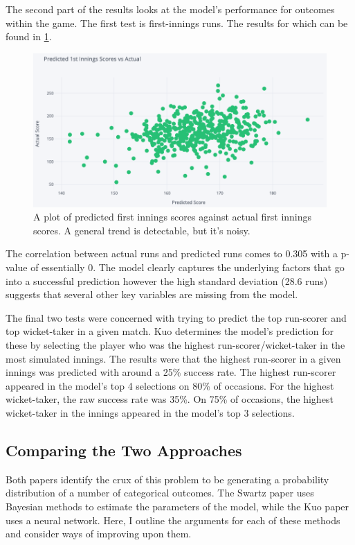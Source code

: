 The second part of the results looks at the model’s performance for outcomes within the game. The first test is first-innings runs. The results for which can be found in \cref{fig:kuo5}.

\begin{figure}
    \centering
    \includegraphics[width=0.9\columnwidth]{images/kuo5.png}
    \caption{A plot of predicted first innings scores against actual first innings scores. A general trend is detectable, but it's noisy.}
    \label{fig:kuo5}
\end{figure}

\clearpage

The correlation between actual runs and predicted runs comes to 0.305 with a p-value of essentially 0. The model clearly captures the underlying factors that go into a successful prediction however the high standard deviation (28.6 runs) suggests that several other key variables are missing from the model.

The final two tests were concerned with trying to predict the top run-scorer and top wicket-taker in a given match. Kuo determines the model’s prediction for these by selecting the player who was the highest run-scorer/wicket-taker in the most simulated innings. The results were that the highest run-scorer in a given innings was predicted with around a 25\% success rate. The highest run-scorer appeared in the model’s top 4 selections on 80\% of occasions. For the highest wicket-taker, the raw success rate was 35\%. On 75\% of occasions, the highest wicket-taker in the innings appeared in the model’s top 3 selections.

\subsection{Comparing the Two Approaches}

Both papers identify the crux of this problem to be generating a probability distribution of a number of categorical outcomes. The Swartz paper uses Bayesian methods to estimate the parameters of the model, while the Kuo paper uses a neural network. Here, I outline the arguments for each of these methods and consider ways of improving upon them.

